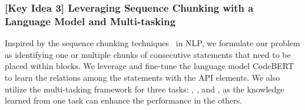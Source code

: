 
\subsubsection{[Key Idea 3] Leveraging Sequence Chunking with a Language Model and Multi-tasking} 
Inspired by the sequence chunking
techniques~\cite{sequence-chunking-aaai17} in NLP, we formulate our
problem as identifying one or multiple chunks of consecutive
statements that need to be placed within  blocks. We
leverage and fine-tune the language model
CodeBERT~\cite{codebert-emnlp20} to learn the relations among the
statements with the API elements. We also utilize the multi-tasking
framework for three tasks: {\xblock}, {\xstate}, and {\xtype}, as the
knowledge learned from one task can enhance the performance in the others.




